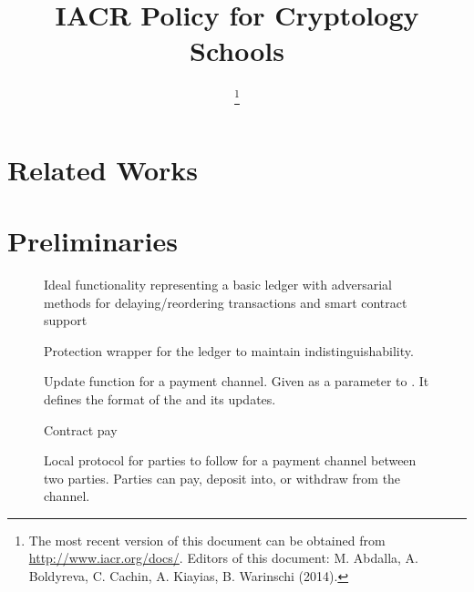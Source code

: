 \documentclass[11pt]{article}
\title{\bf IACR Policy for Cryptology Schools}
\author{\mbox{}}
\date{\lastupdate
 \footnote{The most recent version of this document
    can be obtained from \protect\url{http://www.iacr.org/docs/}.\newline
  Editors of this document: M. Abdalla, A. Boldyreva, C. Cachin, A. Kiayias, B. Warinschi (2014).}}
\begin{document}
\pagestyle{fancy}

\maketitle

\section{Related Works}


\section{Preliminaries}


\begin{figure}[!ht]
	
	\label{fig:functionality:exectx}
\end{figure}

\begin{figure}[!ht]

\label{fig:functionality:execcreate}
\end{figure}

\begin{figure}[!ht]

	\caption{Ideal functionality representing a basic ledger with adversarial methods for delaying/reordering transactions and smart contract support}
	\label{fig:functionality:ledger}
\end{figure}

\begin{figure}
	
	\caption{Protection wrapper for the ledger to maintain indistinguishability.}
\end{figure}

\begin{figure}
	
	\caption{Update function for a payment channel. Given as a parameter to \Fstate. It defines the format of the  and its updates.}
\end{figure}

\begin{figure}
	
	\caption{Contract pay}
\end{figure}

\begin{figure}
	
	\caption{Local protocol for parties to follow for a payment channel between two parties. Parties can pay, deposit into, or withdraw from the channel.}
\end{figure}
\end{document}
